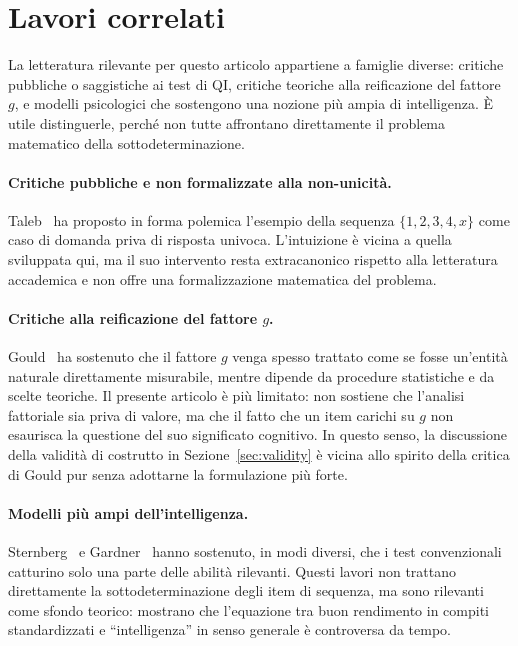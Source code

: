\documentclass[10pt, a4paper]{article}
\theoremstyle{plain}
\theoremstyle{definition}
\theoremstyle{remark}
\begin{document}
\section{Lavori correlati}
\label{sec:related}

La letteratura rilevante per questo articolo appartiene a famiglie diverse:
critiche pubbliche o saggistiche ai test di QI, critiche teoriche alla
reificazione del fattore $g$, e modelli psicologici che sostengono una nozione
più ampia di intelligenza. È utile distinguerle, perché non tutte affrontano
direttamente il problema matematico della sottodeterminazione.

\paragraph{Critiche pubbliche e non formalizzate alla non-unicità.}
Taleb~\cite{taleb2019} ha proposto in forma polemica l'esempio della sequenza
$\{1, 2, 3, 4, x\}$ come caso di domanda priva di risposta univoca. L'intuizione
è vicina a quella sviluppata qui, ma il suo intervento resta extracanonico
rispetto alla letteratura accademica e non offre una formalizzazione
matematica del problema.

\paragraph{Critiche alla reificazione del fattore $g$.}
Gould~\cite{gould1981} ha sostenuto che il fattore $g$ venga spesso trattato
come se fosse un'entità naturale direttamente misurabile, mentre dipende da
procedure statistiche e da scelte teoriche. Il presente articolo è più limitato:
non sostiene che l'analisi fattoriale sia priva di valore, ma che il fatto che
un item carichi su $g$ non esaurisca la questione del suo significato cognitivo.
In questo senso, la discussione della validità di costrutto in
Sezione~\ref{sec:validity} è vicina allo spirito della critica di Gould pur
senza adottarne la formulazione più forte.

\paragraph{Modelli più ampi dell'intelligenza.}
Sternberg~\cite{sternberg1985, sternberg1999} e Gardner~\cite{gardner1983}
hanno sostenuto, in modi diversi, che i test convenzionali catturino solo una
parte delle abilità rilevanti. Questi lavori non trattano direttamente la
sottodeterminazione degli item di sequenza, ma sono rilevanti come sfondo
teorico: mostrano che l'equazione tra buon rendimento in compiti standardizzati
e ``intelligenza'' in senso generale è controversa da tempo.
\end{document}
